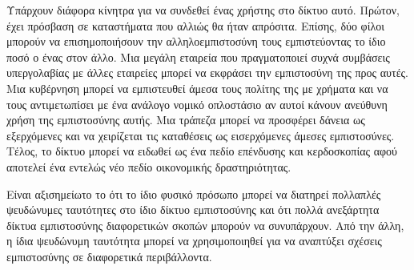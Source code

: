   Υπάρχουν διάφορα κίνητρα για να συνδεθεί ένας χρήστης στο δίκτυο αυτό. Πρώτον, έχει πρόσβαση σε καταστήματα που αλλιώς θα
  ήταν απρόσιτα. Επίσης, δύο φίλοι μπορούν να επισημοποιήσουν την αλληλοεμπιστοσύνη τους εμπιστεύοντας το ίδιο ποσό ο ένας
  στον άλλο. Μια μεγάλη εταιρεία που πραγματοποιεί συχνά συμβάσεις υπεργολαβίας με άλλες εταιρείες μπορεί να εκφράσει την
  εμπιστοσύνη της προς αυτές. Μια κυβέρνηση μπορεί να εμπιστευθεί άμεσα τους πολίτης της με χρήματα και να τους αντιμετωπίσει
  με ένα ανάλογο νομικό οπλοστάσιο αν αυτοί κάνουν ανεύθυνη χρήση της εμπιστοσύνης αυτής. Μια τράπεζα μπορεί να προσφέρει
  δάνεια ως εξερχόμενες και να χειρίζεται τις καταθέσεις ως εισερχόμενες άμεσες εμπιστοσύνες. Τέλος, το δίκτυο μπορεί να
  ειδωθεί ως ένα πεδίο επένδυσης και κερδοσκοπίας αφού αποτελεί ένα εντελώς νέο πεδίο οικονομικής δραστηριότητας.

  Είναι αξισημείωτο το ότι το ίδιο φυσικό πρόσωπο μπορεί να διατη\-ρεί πολλαπλές ψευδώνυμες ταυτότητες στο ίδιο δίκτυο
  εμπιστοσύνης και ότι πολλά ανεξάρτητα δίκτυα εμπιστοσύνης διαφορετικών σκοπών μπορούν να συνυπάρχουν. Από την άλλη, η ίδια
  ψευδώνυμη ταυτότητα μπορεί να χρησιμοποιηθεί για να αναπτύξει σχέσεις εμπιστοσύνης σε διαφορετικά περιβάλλοντα.

